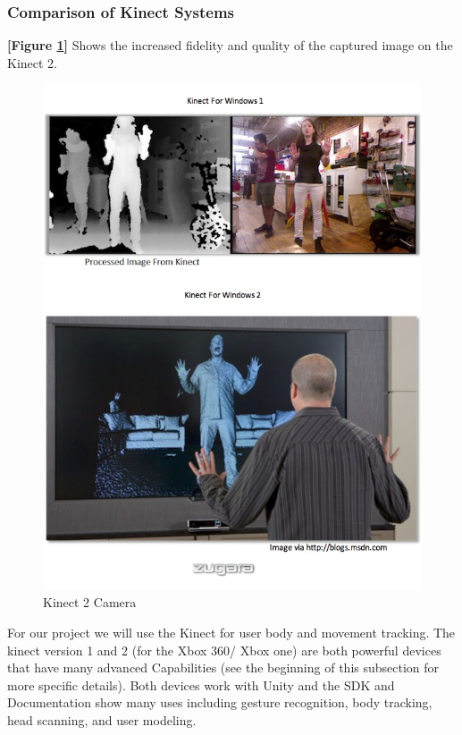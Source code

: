 \documentclass[a4paper,10pt]{article}
\begin{document}
\subsubsection{Comparison of Kinect Systems}
\textbf{[Figure \ref{fig:kimg}]} Shows the increased fidelity and quality of the captured image on the Kinect 2.
\begin{figure}[H]
	\centerline{\includegraphics[scale=0.4]{kinectImg.jpg}}
	\caption{Kinect 2 Camera}
	\label{fig:kimg}
	\end{figure}
	For our project we will use the Kinect for user body and movement tracking. The kinect version 1 and 2 (for the Xbox 360/ Xbox one) are both powerful devices that have many 
	advanced Capabilities (see the beginning of this subsection for more specific details). Both devices work with Unity and the SDK and Documentation show many uses including gesture 
	recognition, body tracking, head scanning, and user modeling.
	\pagebreak	
\end{document}
